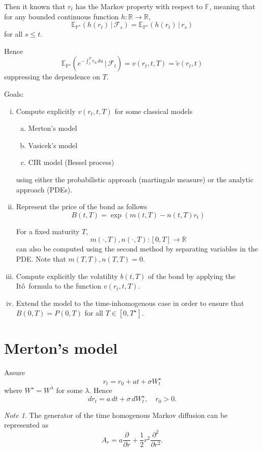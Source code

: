 \documentclass[10pt, oneside, reqno]{amsbook}
\theoremstyle{plain}%
\theoremstyle{definition}
\theoremstyle{remark}
\newtheorem*{note}{Note}
\newcommand{\given}{ \, | \,}
\newcommand{\sigf}{\mathcal{F}}
\newcommand{\R}{\mathbb{R}}
\newcommand{\E}{\mathbb{E}}
\renewcommand{\P}{\mathbb{P}}
\newcommand{\F}{\mathbb{F}}
\newcommand{\ito}{It\^o\ }
\numberwithin{equation}{chapter}
\begin{document}
	Then it known that $r_t$ has the Markov property with respect to $\F$, meaning that for any bounded continuous function $h : \R \rightarrow \R$, \[
 	\E_{\P^\star} \left(h(r_t) \given \sigf_s \right) = \E_{\P^\star}\left(h(r_t) \given r_s \right)
 \] for all $s \leq t$.   

Hence \[
	\E_{\P^\star} \left(e^{-\int_t^T r_u \, du} \given \sigf_t \right) = v(r_t, t, T) = \tilde v(r_t, t) 
\] suppressing the dependence on $T$.

Goals:
\begin{enumerate}[(i)]
	\item Compute explicitly $v(r_t, t, T)$ for some classical models \begin{enumerate}[(a)]
		\item Merton's model 
		\item Vasicek's model
		\item CIR model (Bessel process)
	\end{enumerate}
	using either the probabilistic approach (martingale measure) or the  analytic approach (PDEs).
	\item Represent the price of the bond as follows \[
		B(t, T) = \exp \left( m(t, T) - n(t, T) r_t \right)
	\]
	
	For a fixed maturity $T$, \[
		m(\cdot, T), n(\cdot, T) : [0, T] \rightarrow \R
	\] can also be computed using the second method by separating variables in the PDE.  Note that $m(T, T), n(T, T) = 0$.
	\item Compute explicitly the volatility $b(t, T)$ of the bond by applying the \ito formula to the function $v(r_t, t, T)$.
	\item Extend the model to the time-inhomogenous case in order to ensure that $B(0, T) = P(0, T)$ for all $T \in [0, T^\star]$.
\end{enumerate}

\section{Merton's model} %
\label{sub:merton_s_model}
	Assure \[
		r_t = r_0 + at + \sigma W_t^\star 
	\] where $W^\star = W^\lambda$ for some $\lambda$.  Hence
	\begin{equation}
		dr_t = a \, dt + \sigma \, dW^\star_t, \quad r_0 > 0.
	\end{equation} 
	\begin{note}
		The generator of the time homogenous Markov diffusion can be represented as \[
			A_r = a \frac{\partial }{\partial r} + \frac{1}{2} r^2 \frac{\partial^2}{\partial r^2}.  
		\]
	\end{note}
\end{document}

